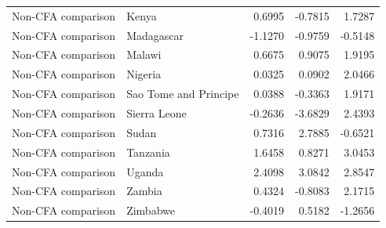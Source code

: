 \begin{table}
\begin{tabular}[t]{llrrr}
Non-CFA comparison & Kenya & 0.6995 & -0.7815 & 1.7287\\
\addlinespace
Non-CFA comparison & Madagascar & -1.1270 & -0.9759 & -0.5148\\
Non-CFA comparison & Malawi & 0.6675 & 0.9075 & 1.9195\\
Non-CFA comparison & Nigeria & 0.0325 & 0.0902 & 2.0466\\
Non-CFA comparison & Sao Tome and Principe & 0.0388 & -0.3363 & 1.9171\\
Non-CFA comparison & Sierra Leone & -0.2636 & -3.6829 & 2.4393\\
\addlinespace
Non-CFA comparison & Sudan & 0.7316 & 2.7885 & -0.6521\\
Non-CFA comparison & Tanzania & 1.6458 & 0.8271 & 3.0453\\
Non-CFA comparison & Uganda & 2.4098 & 3.0842 & 2.8547\\
Non-CFA comparison & Zambia & 0.4324 & -0.8083 & 2.1715\\
Non-CFA comparison & Zimbabwe & -0.4019 & 0.5182 & -1.2656\\
\bottomrule
\end{tabular}
\end{table}